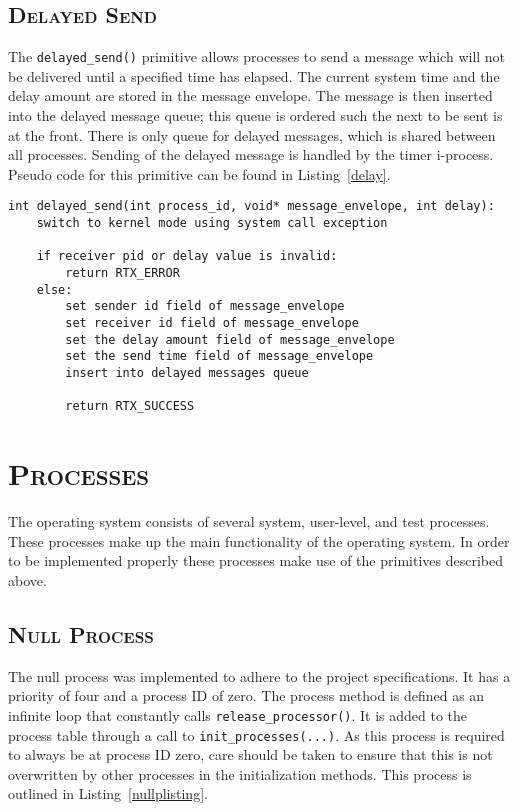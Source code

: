 \documentclass[oneside]{report}
\begin{document}
\subsection{\textsc{Delayed Send}}

The \texttt{delayed\_send()} primitive allows processes to send a
message which will not be delivered until a specified time has
elapsed. The current system time and the delay amount are stored in
the message envelope. The message is then inserted into the delayed
message queue; this queue is ordered such the next to be sent is at
the front. There is only queue for delayed messages, which is shared
between all processes. Sending of the delayed message is handled by
the timer i-process. Pseudo code for this primitive can be found in
Listing~\ref{delay}.

\begin{lstlisting}
int delayed_send(int process_id, void* message_envelope, int delay):
    switch to kernel mode using system call exception

    if receiver pid or delay value is invalid:
        return RTX_ERROR
    else:
        set sender id field of message_envelope
        set receiver id field of message_envelope
        set the delay amount field of message_envelope
        set the send time field of message_envelope
        insert into delayed messages queue

        return RTX_SUCCESS
\end{lstlisting}



\section{\textsc{Processes}}
The operating system consists of several system, user-level, and test processes. 
These processes make up the main functionality of the operating system. In order 
to be implemented properly these processes make use of the primitives described 
above.
\subsection{\textsc{Null Process}}
The null process was implemented to adhere to the project specifications. It
has a priority of four and a process ID of zero. The process method is defined 
as an infinite loop that constantly calls \texttt{release\_processor()}. It is 
added to the process table through a call to \texttt{init\_processes(...)}. As
this process is required to always be at process ID zero, care should be taken
to ensure that this is not overwritten by other processes in the initialization
methods. This process is outlined in Listing~\ref{nullplisting}.
\end{document}
